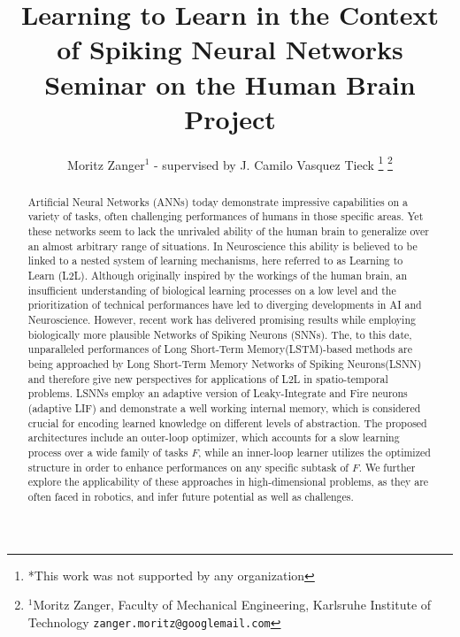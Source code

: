 \documentclass[letterpaper, 10 pt, conference]{ieeeconf}  %
\title{\LARGE \bf
Learning to Learn in the Context of Spiking Neural Networks \newline
Seminar on the Human Brain Project
}
\author{Moritz Zanger$^{1}$ - supervised by J. Camilo Vasquez Tieck  %
\thanks{*This work was not supported by any organization}%
\thanks{$^{1}$Moritz Zanger, Faculty of Mechanical Engineering, Karlsruhe Institute of Technology
        {\tt\small zanger.moritz@googlemail.com}}%
}
\begin{document}
\maketitle
\thispagestyle{empty}
\pagestyle{empty}


\begin{abstract}
Artificial Neural Networks (ANNs) today demonstrate impressive capabilities on a variety of tasks, often challenging performances of humans in 
those specific areas. Yet these networks seem to lack the unrivaled ability of the human brain to generalize over an almost arbitrary range of
situations. In Neuroscience this ability is believed to be linked to a nested system of learning mechanisms, here referred to as 
Learning to Learn (L2L). Although originally inspired by the workings of the human brain, an insufficient understanding of biological learning 
processes on a low level and the prioritization 
of technical performances have led to diverging developments in AI and Neuroscience. However, recent
work has delivered promising results while employing biologically more plausible Networks of Spiking Neurons (SNNs). The, to this date, 
unparalleled performances of Long Short-Term Memory(LSTM)-based methods are being approached by Long Short-Term Memory Networks of Spiking
Neurons(LSNN) and therefore give new perspectives for applications of L2L in spatio-temporal problems. LSNNs employ an adaptive version of Leaky-Integrate
and Fire neurons (adaptive LIF) and demonstrate a well working internal memory, which is considered crucial for encoding learned knowledge
on different levels of abstraction. The proposed architectures include an outer-loop optimizer, which accounts for a slow learning 
process over a wide family of tasks $F$, while an inner-loop learner utilizes the optimized structure in order to enhance performances on 
any specific subtask of $F$. We further explore the applicability of these approaches in high-dimensional problems, as they are often 
faced in robotics, and infer future potential as well as challenges.
\end{abstract}

\end{document}
